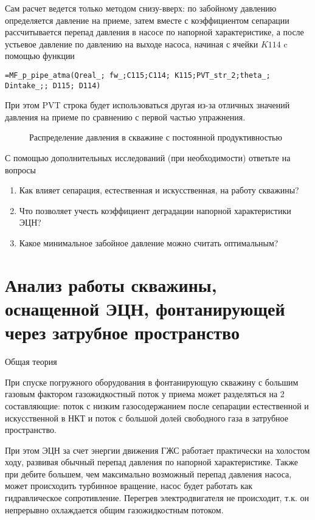 Сам расчет ведется только методом снизу-вверх: по забойному давлению определяется давление на приеме, затем вместе с коэффициентом сепарации рассчитывается перепад давления в насосе по напорной характеристике, а после устьевое давление по давлению на выходе насоса, начиная с ячейки $K114$ c помощью функции

{ \small  \texttt{=MF\_p\_pipe\_atma(Qreal\_; fw\_;C115;C114; K115;PVT\_str\_2;theta\_; Dintake\_;; D115; D114)
}}

При этом PVT строка будет использоваться другая из-за отличных значений давления на приеме по сравнению с первой частью упражнения.

\begin{figure}[h!]
	\center{\texttt{[image: Ex100\_3]}}
	\caption{Распределение давления в скважине с постоянной продуктивностью}
	\label{ris:Ex100_3}
\end{figure}

С помощью дополнительных исследований (при необходимости) ответьте на вопросы

\begin{enumerate}
	\item Как влияет сепарация, естественная и искусственная, на работу скважины?
	\item Что позволяет учесть коэффициент деградации напорной характеристики ЭЦН?
	\item Какое минимальное забойное давление можно считать оптимальным?
\end{enumerate}


\section{Анализ работы скважины, оснащенной ЭЦН, фонтанирующей через затрубное пространство}

Общая теория 

При спуске погружного оборудования в фонтанирующую скважину с большим газовым фактором газожидкостный поток у приема может разделяться на 2 составляющие: поток с низким газосодержанием после сепарации естественной и искусственной в НКТ и поток с большой долей свободного газа в затрубное пространство. 

При этом ЭЦН за счет энергии движения ГЖС работает практически на холостом ходу, развивая обычный перепад давления по напорной характеристике. Также при дебите большем, чем максимально возможный перепад давления  насоса, может происходить турбинное вращение, насос будет работать как гидравлическое сопротивление. Перегрев электродвигателя не происходит, т.к. он непрерывно охлаждается общим газожидкостным потоком.

